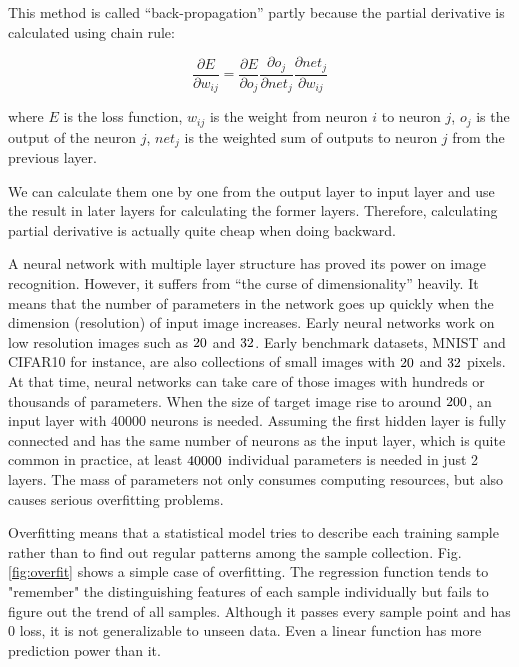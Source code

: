 This method is called \enquote{back-propagation} partly because the partial derivative is calculated using chain rule:

\begin{equation}
\frac{\partial E}{\partial w_{ij}} = \frac{\partial E}{\partial o_j} \frac{\partial o_j}{\partial net_j} \frac{\partial net_j}{\partial w_{ij}}
\end{equation}

where $E$ is the loss function, $w_{ij}$ is the weight from neuron $i$ to neuron $j$, $o_j$ is the output of the neuron $j$, $net_j$ is the weighted sum of outputs to neuron $j$ from the previous layer.

We can calculate them one by one from the output layer to input layer and use the result in later layers for calculating the former layers. Therefore, calculating partial derivative is actually quite cheap when doing backward.

A neural network with multiple layer structure has proved its power on image recognition. However, it suffers from \enquote{the curse of dimensionality} heavily. It means that the number of parameters in the network goes up quickly when the dimension (resolution) of input image increases. Early neural networks work on low resolution images such as $20 \time 20$ and $32 \time 32$. Early benchmark datasets, MNIST and CIFAR10 for instance, are also collections of small images with $20 \time 20$ and $32 \time 32$ pixels. At that time, neural networks can take care of those images with hundreds or thousands of parameters. When the size of target image rise to around $200 \time 200$, an input layer with 40000 neurons is needed. Assuming the first hidden layer is fully connected and has the same number of neurons as the input layer, which is quite common in practice, at least $40000 \time 40000$ individual parameters is needed in just 2 layers. The mass of parameters not only consumes computing resources, but also causes serious overfitting problems. 

Overfitting means that a statistical model tries to describe each training sample rather than to find out regular patterns among the sample collection. Fig.\ref{fig:overfit} shows a simple case of overfitting. The regression function tends to "remember" the distinguishing features of each sample individually but fails to figure out the trend of all samples. Although it passes every sample point and has 0 loss, it is not generalizable to unseen data. Even a linear function has more prediction power than it. 

